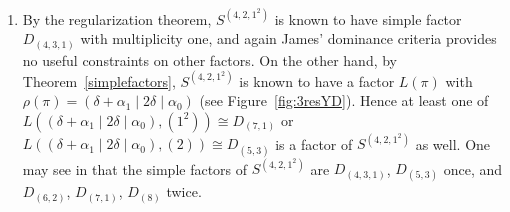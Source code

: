\documentclass[Unicode,ALCO]{cedram}
\newcommand{\0}{{\bar 0}}
\begin{document}
\begin{exam}
\begin{enumerate}
\item[(2)] By the regularization theorem, \(S^{(4,2,1^2)}\) is known to have simple factor \(D_{(4,3,1)}\) with multiplicity one, and again James' dominance criteria provides no useful constraints on other factors. On the other hand, by Theorem~\ref{simplefactors},  \(S^{(4,2,1^2)}\) is known to have a factor \(L(\pi)\) with \(\rho(\pi) = (\delta + \alpha_1 \mid 2\delta \mid \alpha_0)\) (see Figure~\ref{fig:3resYD}). Hence at least one
of \( L((\delta + \alpha_1 \mid 2\delta \mid \alpha_0), (1^2)) \cong D_{(7,1)}\) or \( L((\delta + \alpha_1 \mid 2\delta \mid  \alpha_0), (2))\cong D_{(5,3)}\) is a factor of \(S^{(4,2,1^2)}\)  as well. One may see in \cite{JamesBookRepSym} that the simple factors of \(S^{(4,2,1^2)}\) are \(D_{(4,3,1)}\), \(D_{(5,3)}\) once, and \(D_{(6,2)}\), \(D_{(7,1)}\), \(D_{(8)}\) twice.
\end{enumerate}


\end{exam}
\end{document}

